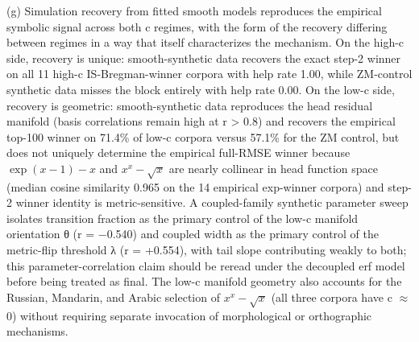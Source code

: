 \documentclass[11pt]{article}
\begin{document}
(g) Simulation recovery from fitted smooth models reproduces the empirical symbolic signal across both c regimes, with the form of the recovery differing between regimes in a way that itself characterizes the mechanism. On the high-c side, recovery is unique: smooth-synthetic data recovers the exact step-2 winner on all 11 high-c IS-Bregman-winner corpora with help rate 1.00, while ZM-control synthetic data misses the block entirely with help rate 0.00. On the low-c side, recovery is geometric: smooth-synthetic data reproduces the head residual manifold (basis correlations remain high at r > 0.8) and recovers the empirical top-100 winner on 71.4\% of low-c corpora versus 57.1\% for the ZM control, but does not uniquely determine the empirical full-RMSE winner because $\exp(x-1)-x$ and $x^x-\sqrt{x}$ are nearly collinear in head function space (median cosine similarity 0.965 on the 14 empirical exp-winner corpora) and step-2 winner identity is metric-sensitive. A coupled-family synthetic parameter sweep isolates transition fraction as the primary control of the low-c manifold orientation θ (r = −0.540) and coupled width as the primary control of the metric-flip threshold λ (r = +0.554), with tail slope contributing weakly to both; this parameter-correlation claim should be reread under the decoupled erf model before being treated as final. The low-c manifold geometry also accounts for the Russian, Mandarin, and Arabic selection of $x^x-\sqrt{x}$ (all three corpora have c $\approx$ 0) without requiring separate invocation of morphological or orthographic mechanisms.
\end{document}
